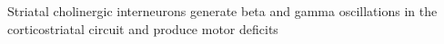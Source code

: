 Striatal cholinergic interneurons generate beta and gamma oscillations in the corticostriatal circuit and produce motor deficits
